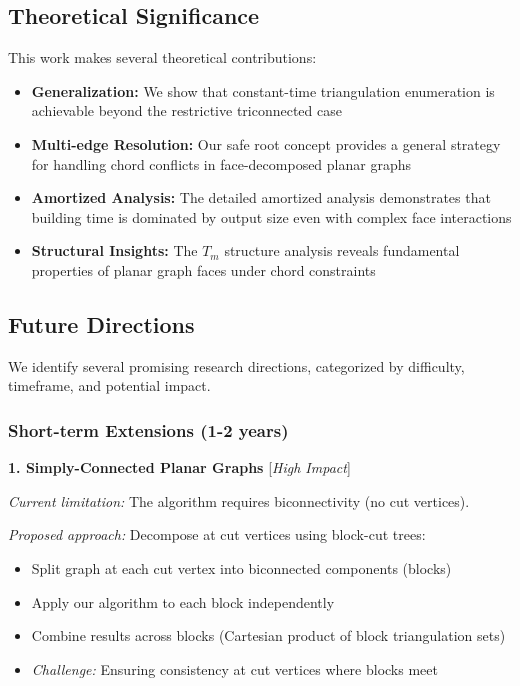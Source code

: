 \documentclass[12pt,a4paper]{article}
\theoremstyle{definition}
\theoremstyle{remark}
\begin{document}
\subsection{Theoretical Significance}

This work makes several theoretical contributions:

\begin{itemize}
    \item \textbf{Generalization:} We show that constant-time triangulation enumeration is achievable beyond the restrictive triconnected case
    \item \textbf{Multi-edge Resolution:} Our safe root concept provides a general strategy for handling chord conflicts in face-decomposed planar graphs
    \item \textbf{Amortized Analysis:} The detailed amortized analysis demonstrates that building time is dominated by output size even with complex face interactions
    \item \textbf{Structural Insights:} The $T_m$ structure analysis reveals fundamental properties of planar graph faces under chord constraints
\end{itemize}

\subsection{Future Directions}

We identify several promising research directions, categorized by difficulty, timeframe, and potential impact.

\subsubsection{Short-term Extensions (1-2 years)}

\textbf{1. Simply-Connected Planar Graphs} [\textit{High Impact}]

\textit{Current limitation:} The algorithm requires biconnectivity (no cut vertices).

\textit{Proposed approach:} Decompose at cut vertices using block-cut trees:
\begin{itemize}
\item Split graph at each cut vertex into biconnected components (blocks)
\item Apply our algorithm to each block independently
\item Combine results across blocks (Cartesian product of block triangulation sets)
\item \textit{Challenge:} Ensuring consistency at cut vertices where blocks meet
\end{itemize}
\end{document}
